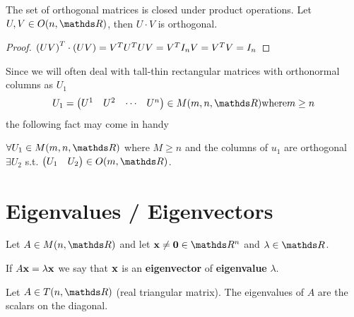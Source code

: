 \documentclass[computationalMathematics.tex]{subfiles}
\begin{document}
\begin{proposition}
  The set of orthogonal matrices is closed under product operations.
  Let $U, V \in O(n, \R)$, then $U \cdot V$ is orthogonal.
\end{proposition}

\begin{proof}
  ${(UV)}^{T} \cdot (UV) = {V}^{T} {U}^{T} U V = {V}^{T} I_n V = {V}^{T} V = I_n$
\end{proof}

Since we will often deal with tall-thin rectangular matrices with
orthonormal columns as $U_1$
  \[
    U_1 = \begin{pmatrix} U^1 & U^2 & \cdots & U^n\end{pmatrix} \in M(m, n, \R) \text{where} m \geq n
  \]
the following fact may come in handy

\begin{proposition}
  $\forall U_1 \in M(m, n, \R)$ where $M \ge n$ and the columns of $u_1$ are orthogonal $\exists U_2$ s.t. $\begin{pmatrix} U_1 & U_2 \end{pmatrix} \in O(m, \R)$.
\end{proposition}

\section{Eigenvalues / Eigenvectors}

\begin{definition}\label{def:eigenvalues}
  Let $A \in M(n, \R)$ and let $\vect{x} \neq \vect{0} \in \R^n$ and $\lambda \in \R$.

  If $A{\bf x } = \lambda {\bf x }$ we say that ${\bf x }$ is an \textbf{eigenvector} of \textbf{eigenvalue} $\lambda$.
\end{definition}

\begin{theorem}
  Let $A \in T(n, \R)$ (real triangular matrix). The eigenvalues of $A$ are the scalars on the diagonal.
\end{theorem}
\end{document}
